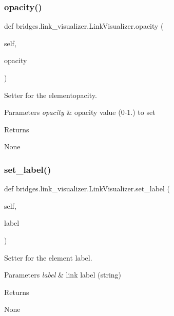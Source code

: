 \subsubsection{\texorpdfstring{opacity()}{opacity()}\hspace{0.1cm}{\footnotesize\ttfamily [2/2]}}
{\footnotesize\ttfamily def bridges.\+link\+\_\+visualizer.\+Link\+Visualizer.\+opacity (\begin{DoxyParamCaption}\item[{}]{self,  }\item[{}]{opacity }\end{DoxyParamCaption})}



Setter for the elementopacity. 


\begin{DoxyParams}{Parameters}
{\em opacity} & opacity value (0-\/1.) to set \\
\hline
\end{DoxyParams}
\begin{DoxyReturn}{Returns}


None 
\end{DoxyReturn}
\mbox{\label{classbridges_1_1link__visualizer_1_1_link_visualizer_a51cb90a9162271fa083616321ae5faee}} 
\subsubsection{\texorpdfstring{set\+\_\+label()}{set\_label()}}
{\footnotesize\ttfamily def bridges.\+link\+\_\+visualizer.\+Link\+Visualizer.\+set\+\_\+label (\begin{DoxyParamCaption}\item[{}]{self,  }\item[{}]{label }\end{DoxyParamCaption})}



Setter for the element label. 


\begin{DoxyParams}{Parameters}
{\em label} & link label (string) \\
\hline
\end{DoxyParams}
\begin{DoxyReturn}{Returns}


None 
\end{DoxyReturn}
\mbox{\label{classbridges_1_1link__visualizer_1_1_link_visualizer_a4a89f95ecc6623ba17d2c47d7425c05b}} 
